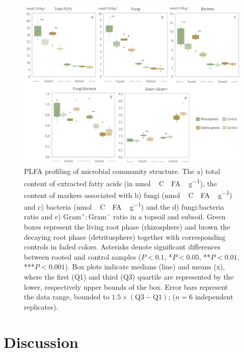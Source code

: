 \begin{figure}[H] %
  \centering
  \includegraphics[width=1\textwidth]{img/M5-Figure_3.png} %
  \caption{PLFA profiling of microbial community structure. The a) total content of extracted fatty acids (in \si{nmol\,C\text{-}FA\,\gram^{-1}}), the content of markers associated with b) fungi (\si{nmol\,C\text{-}FA\,\gram^{-1}}) and c) bacteria (\si{nmol\,C\text{-}FA\,\gram^{-1}}) and the d) fungi:bacteria ratio and e) $\text{Gram}^{+}:\text{Gram}^{-}$ ratio in a topsoil and subsoil. Green boxes represent the living root phase (rhizosphere) and brown the decaying root phase (detritusphere) together with corresponding controls in faded colors. Asterisks denote significant differences between rooted and control samples (\textbullet\(P < 0.1\), *\(P < 0.05\), **\(P < 0.01\), ***\(P < 0.001\)). Box plots indicate medians (line) and means (x), where the first (Q1) and third (Q3) quartile are represented by the lower, respectively upper bounds of the box. Error bars represent the data range, bounded to \(1.5 \times (\text{Q3}-\text{Q1})\); (\(n = 6\) independent replicates).} %
  \label{fig:M5-F3} %
\end{figure}

\section{Discussion}


